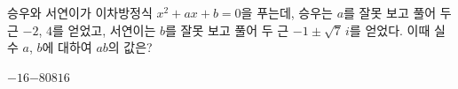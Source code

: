 승우와 서연이가 이차방정식 $x^2+ax+b=0$을 푸는데, 승우는 $a$를 잘못 보고 풀어 두 근 $-2$, $4$를 얻었고, 서연이는 $b$를 잘못 보고 풀어 두 근 $-1\pm\sqrt{7}\,i$를 얻었다. 이때 실수 $a$, $b$에 대하여 $ab$의 값은?
\begin{choices32}{$-16$}{$-8$}{$0$}{$8$}{$16$}\end{choices32}
